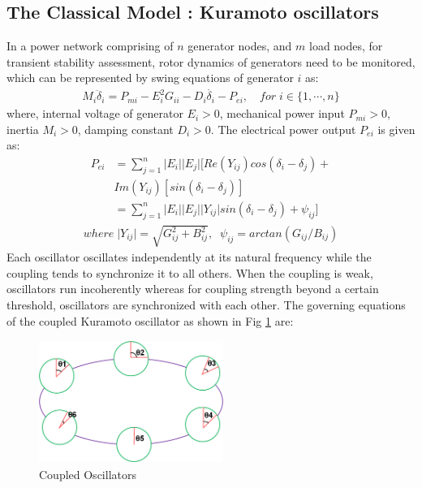 \documentclass{ifacconf}
\begin{document}
\subsection{The Classical Model : Kuramoto oscillators}
In a power network comprising of $n$ generator nodes, and $m$ load nodes, for transient stability assessment, rotor dynamics of generators need to be monitored, which can be represented by swing equations of generator $i$ as:
\begin{align} \label{eq:1}
M_{i}\ddot{\delta}_{i}=P_{mi}-E_{i}^{2}G_{ii}-D_{i}\dot{\delta_{i}}-P_{ei},\quad for\;i \in \lbrace1,\cdots,n \rbrace
\end{align}
where, internal voltage of generator $E_{i}>0$, mechanical power input $P_{mi}>0$, inertia $M_{i}>0$, damping constant $D_{i}>0$.
The electrical power output $P_{ei}$ is given as:
\begin{align}
P_{ei} &= \sum_{j=1}^{n}\vert E_{i}\vert\vert E_{j}  \vert[Re(Y_{ij})cos(\delta_{i}-\delta_{j})+  \nonumber \\ 
& Im(Y_{ij})[sin(\delta_{i}-\delta_{j})] \nonumber\\
&=\sum_{j=1}^{n}\vert E_{i}\vert\vert E_{j} \vert \vert Y_{ij} \vert sin(\delta_{i}-\delta_{j})+\psi_{ij}] 
\end{align} 
\begin{align}\label{eq:3}
where \; \vert Y_{ij} \vert=\sqrt {G_{ij}^2+B_{ij}^2} ,\;\;
\psi_{ij} =arctan(G_{ij}/B_{ij})
\end{align}
\indent Each oscillator oscillates independently at its natural frequency while the coupling tends to synchronize it to all others. When the coupling is weak, oscillators run incoherently whereas for coupling strength beyond a certain threshold, oscillators are synchronized with each other.  The governing equations of the coupled Kuramoto oscillator as shown in Fig \ref{fig:3} are:
\begin{figure}[h!]
\begin{center}
\includegraphics[width=6cm,height=4cm]{kura.png}
\caption{Coupled Oscillators}
\label{fig:3}
\end{center}
\end{figure}
\end{document}
